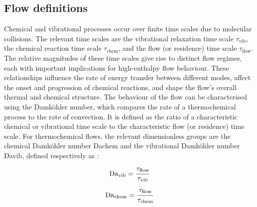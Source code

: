 \subsection{Flow definitions}

Chemical and vibrational processes occur over finite time scales due to molecular collisions. The relevant time scales are the vibrational relaxation time scale $\tau_{\mathrm{vib}}$, the chemical reaction time scale $\tau_{\mathrm{chem}}$, and the flow (or residence) time scale $\tau_{\mathrm{flow}}$. The relative magnitudes of these time scales give rise to distinct flow regimes, each with important implications for high-enthalpy flow behaviour. These relationships influence the rate of energy transfer between different modes, affect the onset and progression of chemical reactions, and shape the flow's overall thermal and chemical structure. The behaviour of the flow can be characterised using the Damköhler number, which compares the rate of a thermochemical process to the rate of convection. It is defined as the ratio of a characteristic chemical or vibrational time scale to the characteristic flow (or residence) time scale. For thermochemical flows, the relevant dimensionless groups are the chemical Damköhler number \gls{Dachem} and the vibrational Damköhler number \gls{Davib}, defined respectively as \citep{miromiroThesis}: \begin{equation}\label{equation:davib}
    \mathrm{Da}_{\mathrm{vib}} = \cfrac{\tau_{\mathrm{flow}}}{\tau_{\mathrm{vib}}}
\end{equation} \begin{equation}\label{equation:dachem}
    \mathrm{Da}_{\mathrm{chem}} = \cfrac{\tau_{\mathrm{flow}}}{\tau_{\mathrm{chem}}}
\end{equation} 

